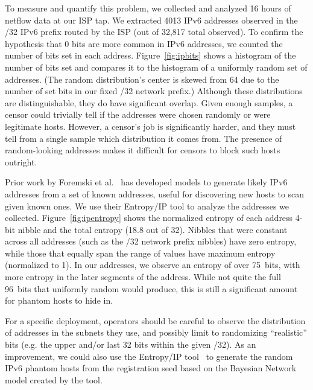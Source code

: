 \documentclass[sigconf]{acmart}
\begin{document}
To measure and quantify this problem, we collected and analyzed 16 hours of
netflow data at our ISP tap. We extracted 4013 IPv6 addresses observed in the /32
IPv6 prefix routed by the ISP (out of 32,817 total observed). To confirm the
hypothesis that 0 bits are more common in IPv6 addresses, we counted the number
of bits set in each address. Figure~\ref{fig:ipbits} shows a histogram of the
number of bits set and compares it to the histogram of a uniformly random set of
addresses. (The random distribution's center is skewed from 64 due to
the number of set bits in our fixed /32 network prefix.) Although these
distributions are distinguishable, they do have significant overlap. Given
enough samples, a censor could trivially tell if the addresses were chosen
randomly or were legitimate hosts. However, a censor's job is significantly
harder, and they must tell from a single sample which distribution it comes
from. The presence of random-looking addresses makes it difficult for censors to
block such hosts outright.


\FigIpEntropy

Prior work by Foremski et al.~\cite{foremski2016entropy} has developed models to
generate likely IPv6 addresses from a set of known addresses, useful for
discovering new hosts to scan given known ones. We use their Entropy/IP tool to
analyze the addresses we collected. Figure~\ref{fig:ipentropy} shows the
normalized entropy of each address 4-bit nibble and the total entropy (18.8 out
of 32). Nibbles that were constant across all addresses
(such as the /32 network prefix nibbles) have zero entropy, while those that
equally span the range of values have maximum entropy (normalized to 1). In our
addresses, we observe an entropy of over 75~bits, with more entropy in the later
segments of the address. While not quite the full 96~bits that uniformly random
would produce, this is still a significant amount for phantom hosts to hide in.

For a specific deployment, operators should be careful to observe the distribution of
addresses in the subnets they use, and possibly limit to randomizing ``realistic''
bits (e.g. the upper and/or last 32 bits within the given /32).
As an improvement, we could also use the Entropy/IP
tool~\cite{foremski2016entropy} to generate the random IPv6 phantom hosts from
the registration seed based on the Bayesian Network model created by the tool.
\end{document}

